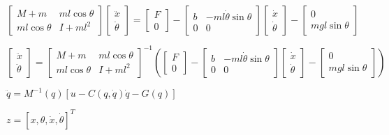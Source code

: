 \documentclass{article}
\begin{document}
$\left[ 
\begin{array}{cc}
M+m & ml\cos \theta  \\ 
ml\cos \theta  & I+ml^{2}%
\end{array}%
\right] \left[ 
\begin{array}{c}
\ddot{x} \\ 
\ddot{\theta}%
\end{array}%
\right] =\left[ 
\begin{array}{c}
F \\ 
0%
\end{array}%
\right] -\left[ 
\begin{array}{cc}
b & -ml\dot{\theta}\sin \theta  \\ 
0 & 0%
\end{array}%
\right] \left[ 
\begin{array}{c}
\dot{x} \\ 
\dot{\theta}%
\end{array}%
\right] -\left[ 
\begin{array}{c}
0 \\ 
mgl\sin \theta 
\end{array}%
\right] $

$\left[ 
\begin{array}{c}
\ddot{x} \\ 
\ddot{\theta}%
\end{array}%
\right] =\left[ 
\begin{array}{cc}
M+m & ml\cos \theta  \\ 
ml\cos \theta  & I+ml^{2}%
\end{array}%
\right] ^{-1}\left( \left[ 
\begin{array}{c}
F \\ 
0%
\end{array}%
\right] -\left[ 
\begin{array}{cc}
b & -ml\dot{\theta}\sin \theta  \\ 
0 & 0%
\end{array}%
\right] \left[ 
\begin{array}{c}
\dot{x} \\ 
\dot{\theta}%
\end{array}%
\right] -\left[ 
\begin{array}{c}
0 \\ 
mgl\sin \theta 
\end{array}%
\right] \right) $

$\ddot{q}=M^{-1}(q)\left[ u-C(q,\dot{q})\dot{q}-G(q)\right] $

$z=[x,\theta ,\dot{x},\dot{\theta}]^{T}$
\end{document}
